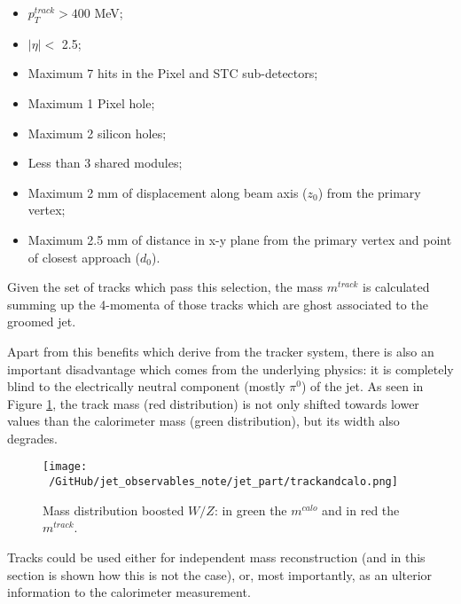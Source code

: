 \begin{itemize}
 \item $p_T^{track} > 400$ MeV;
 \item $|\eta|<$ 2.5;
 \item Maximum 7 hits in the Pixel and STC sub-detectors;
 \item Maximum 1 Pixel hole;
 \item Maximum 2 silicon holes;
 \item Less than 3 shared modules;
 \item Maximum 2 mm of displacement along beam axis ($z_0$) from the primary vertex;
 \item Maximum 2.5 mm of distance in x-y plane from the primary vertex and point of closest approach ($d_0$).
\end{itemize}

Given the set of tracks which pass this selection, the mass $m^{track}$ is calculated summing up the 4-momenta of those tracks which are ghost associated to the groomed jet.


Apart from this benefits which derive from the tracker system, there is also an important disadvantage which comes from the underlying physics: it is completely blind to the electrically neutral component (mostly $\pi^0$) of the jet. As seen in Figure \ref{fig:trackandcalo}, the track mass (red distribution) is not only shifted towards lower values than the calorimeter mass (green distribution), but its width also degrades. 

\begin{figure}[!ht]
  \centering
      \texttt{[image: ~/GitHub/jet\_observables\_note/jet\_part/trackandcalo.png]}
  \caption[Mass distribution for boosted $W/Z$]{Mass distribution boosted $W/Z$: in green the $m^{calo}$ and in red the $m^{track}$. }
  \label{fig:trackandcalo}
\end{figure}

Tracks could be used either for independent mass reconstruction (and in this section is shown how this is not the case), or, most importantly, as an ulterior information to the calorimeter measurement.

